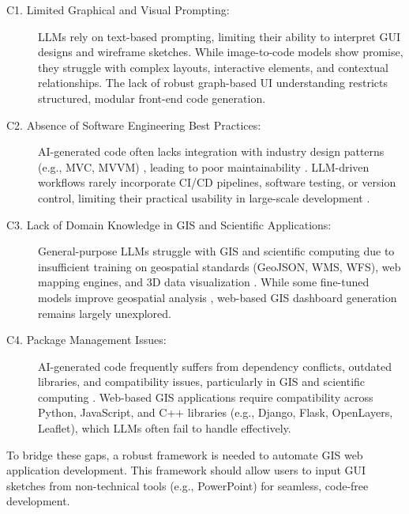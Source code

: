 \begin{description} \item[C1. Limited Graphical and Visual Prompting:] LLMs rely on text-based prompting, limiting their ability to interpret GUI designs and wireframe sketches. While image-to-code models show promise, they struggle with complex layouts, interactive elements, and contextual relationships. The lack of robust graph-based UI understanding restricts structured, modular front-end code generation.

\item[C2. Absence of Software Engineering Best Practices:] AI-generated code often lacks integration with industry design patterns (e.g., MVC, MVVM) \citep{xiao2024prototype2code}, leading to poor maintainability \citep{ghoshdesign, nguyen2023generative}. LLM-driven workflows rarely incorporate CI/CD pipelines, software testing, or version control, limiting their practical usability in large-scale development \citep{corona2025question, mendoza2024development}.

\item[C3. Lack of Domain Knowledge in GIS and Scientific Applications:] General-purpose LLMs struggle with GIS and scientific computing due to insufficient training on geospatial standards (GeoJSON, WMS, WFS), web mapping engines, and 3D data visualization \citep{zhang2024bb, mansourian2024chatgeoai, hou2024can}. While some fine-tuned models improve geospatial analysis \citep{hadid2024geoscience, hou2024geocode, akinboyewa2024gis}, web-based GIS dashboard generation remains largely unexplored.

\item[C4. Package Management Issues:] AI-generated code frequently suffers from dependency conflicts, outdated libraries, and compatibility issues, particularly in GIS and scientific computing \citep{hou2024can, mahmoudi2023development}. Web-based GIS applications require compatibility across Python, JavaScript, and C++ libraries (e.g., Django, Flask, OpenLayers, Leaflet), which LLMs often fail to handle effectively.

\end{description}

To bridge these gaps, a robust framework is needed to automate GIS web application development. This framework should allow users to input GUI sketches from non-technical tools (e.g., PowerPoint) for seamless, code-free development.

 